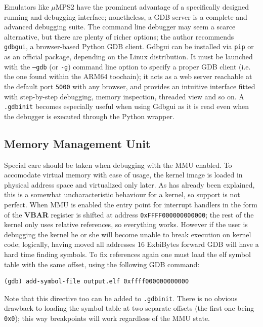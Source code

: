 \documentclass[12pt,a4paper,openright,twoside]{report}
\begin{document}
Emulators like $\mu$MPS2 have the prominent advantage of a specifically designed
running and debugging interface; nonetheless, a GDB server is a complete and
advanced debugging suite. The command line debugger may seem a scarce alternative,
but there are plenty of richer options; the author recommends {\tt gdbgui}, 
a browser-based Python GDB client.
Gdbgui can be installed via {\tt pip} or as an official package, depending on 
the Linux distribution. It must be launched
with the {\tt --gdb} (or {\tt -g}) command line option to specify a proper GDB
client (i.e. the one found within the ARM64 toochain); it acts as a web server
reachable at the default port {\tt 5000} with any browser, and provides an intuitive
interface fitted with step-by-step debugging, memory inspection, threaded view and
so on.
A {\tt .gdbinit} becomes especially useful when using Gdbgui as it is read even 
when the debugger is executed through the Python wrapper.

\subsection{Memory Management Unit}
Special care should be taken when debugging with the MMU enabled. To accomodate
virtual memory with ease of usage, the kernel image is loaded in physical address
space and virtualized only later. As has already been explained, this is a somewhat
uncharacteristic behaviour for a kernel, so support is not perfect.
When MMU is enabled the entry point for interrupt handlers in the form of the
\textbf{VBAR} register is shifted at address {\tt 0xFFFF000000000000}; the rest
of the kernel only uses relative references, so everything works.
However if the user is debugging the kernel he or she will become unable to break
execution on kernel code; logically, having moved all addresses 16 ExbiBytes forward
GDB will have a hard time finding symbols. To fix references again one must
load the elf symbol table with the same offset, using the following GDB command:

\begin{lstlisting}
(gdb) add-symbol-file output.elf 0xffff000000000000
\end{lstlisting}

Note that this directive too can be added to {\tt .gdbinit}. There is no 
obvious drawback to loading the symbol table at two separate offsets (the first
one being {\tt 0x0}); this way breakpoints will work regardless of the MMU state.
\end{document}
